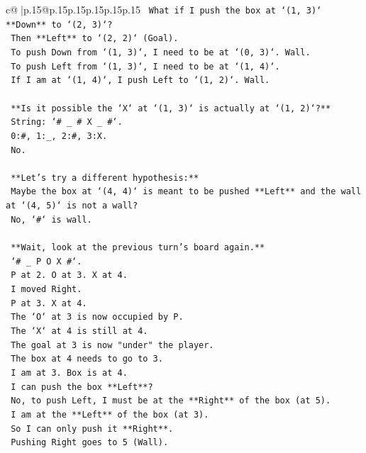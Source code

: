 \documentclass{article}
\begin{document}
{\begin{supertabular}{c@{$\;$}|p{.15\linewidth}@{}p{.15\linewidth}p{.15\linewidth}p{.15\linewidth}p{.15\linewidth}p{.15\linewidth}}
{{{\texttt{    What if I push the box at `(1, 3)` **Down** to `(2, 3)`?} \\
\texttt{    Then **Left** to `(2, 2)` (Goal).} \\
\texttt{    To push Down from `(1, 3)`, I need to be at `(0, 3)`. Wall.} \\
\texttt{    To push Left from `(1, 3)`, I need to be at `(1, 4)`.} \\
\texttt{    If I am at `(1, 4)`, I push Left to `(1, 2)`. Wall.} \\
\\ 
\texttt{    **Is it possible the `X` at `(1, 3)` is actually at `(1, 2)`?**} \\
\texttt{    String: `\# \_ \# X \_ \#`.} \\
\texttt{    0:\#, 1:\_, 2:\#, 3:X.} \\
\texttt{    No.} \\
\\ 
\texttt{    **Let's try a different hypothesis:**} \\
\texttt{    Maybe the box at `(4, 4)` is meant to be pushed **Left** and the wall at `(4, 5)` is not a wall?} \\
\texttt{    No, `\#` is wall.} \\
\\ 
\texttt{    **Wait, look at the previous turn's board again.**} \\
\texttt{    `\# \_ P O X \#`.} \\
\texttt{    P at 2. O at 3. X at 4.} \\
\texttt{    I moved Right.} \\
\texttt{    P at 3. X at 4.} \\
\texttt{    The `O` at 3 is now occupied by P.} \\
\texttt{    The `X` at 4 is still at 4.} \\
\texttt{    The goal at 3 is now "under" the player.} \\
\texttt{    The box at 4 needs to go to 3.} \\
\texttt{    I am at 3. Box is at 4.} \\
\texttt{    I can push the box **Left**?} \\
\texttt{    No, to push Left, I must be at the **Right** of the box (at 5).} \\
\texttt{    I am at the **Left** of the box (at 3).} \\
\texttt{    So I can only push it **Right**.} \\
\texttt{    Pushing Right goes to 5 (Wall).} \\
}}}
\end{supertabular}}
\end{document}
